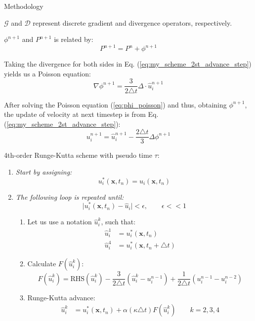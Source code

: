 \documentclass{beamer}
\newcommand{\timestep}{ \triangle t }
\begin{document}
\begin{frame}{Methodology}
	\begin{block}{}
		$\mathcal{G}$ and $\mathcal{D}$ represent discrete gradient and divergence operators, respectively.
	\end{block}
	
	$\phi^{n+1}$ and $P^{n+1}$ is related by:
	\begin{equation}
		P^{n+1} = P^n + \phi^{n+1}
	\end{equation}
	
	Taking the divergence for both sides in Eq. (\ref{eq:my_scheme_2st_advance_step}) yields us a Poisson equation:
	\begin{equation}
		\nabla \phi^{n+1} = \frac{3}{2 \timestep} \Delta \cdot \hat{u}_i^{n+1} \label{eq:phi_poisson}
	\end{equation}
	
	After solving the Poisson equation (\ref{eq:phi_poisson}) and thus, obtaining $\phi^{n+1}$, the update of velocity at next timestep is from Eq. (\ref{eq:my_scheme_2st_advance_step}):
	\begin{equation}
		u_i^{n+1} = \hat{u}_i^{n+1} - \frac{2 \timestep}{3} \Delta \phi^{n+1}
	\end{equation}
	

	\framebreak
	
	4th-order Runge-Kutta scheme with pseudo time $\tau$:
	\begin{enumerate}
		\item \emph{Start by assigning:}
			\begin{equation}
				u_i^*(\mathbf{x}, t_n) = u_i(\mathbf{x}, t_n)
			\end{equation}
		\item \emph{The following loop is repeated until:}
			\begin{equation}
				\mid u_i^*(\mathbf{x}, t_n) - \hat{u}_i \mid < \epsilon, \qquad \epsilon << 1
			\end{equation}
			
			\begin{enumerate}
				\item Let us use a notation $\hat{u}_i^k$, such that:
					\begin{align}
						\hat{u}_i^1 &= u_i^*(\mathbf{x}, t_n) \\
						\hat{u}_i^4 &= u_i^*(\mathbf{x}, t_n + \timestep)
					\end{align}
				\item Calculate $F(\hat{u}_i^k)$:
					\begin{equation}
						F(\hat{u}_i^k) = \text{RHS}(\hat{u}_i^k) - \frac{3}{2 \timestep} \left( \hat{u}_i^k - u_i^{n-1} \right) + \frac{1}{2 \timestep} \left( u_i^{n-1} - u_i^{n-2} \right)
					\end{equation}
				\item Runge-Kutta advance:
					\begin{align}
						\hat{u}_i^k &= u_i^*(\mathbf{x}, t_n) + \alpha \left( \kappa \timestep \right) F(\hat{u}_i^k) \qquad k = 2,3,4 \\
					\end{align}
			\end{enumerate}
	\end{enumerate}
	

\end{frame}
\end{document}
